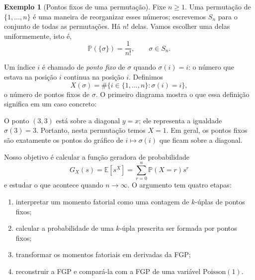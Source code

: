 \documentclass[12pt,portuguese]{article}
\theoremstyle{definition}
\newtheorem{example}[example]{Exemplo}
\theoremstyle{plainexercise}
\theoremstyle{starredexercise}
\theoremstyle{definition}
\begin{document}
\begin{example}[Pontos fixos de uma permutação]\label{ex:pontos-fixos-permutacao}
Fixe $n\geqslant1$. Uma permutação de
$\{1,\ldots,n\}$ é uma maneira de reorganizar esses números; escrevemos
$S_n$ para o conjunto de todas as permutações. Há $n!$ delas. Vamos escolher
uma delas uniformemente, isto é,
\[
\mathbb{P}(\{\sigma\})=\frac{1}{n!},
\qquad \sigma\in S_n.
\]

Um índice $i$ é chamado de \emph{ponto fixo} de $\sigma$ quando
$\sigma(i)=i$: o número que estava na posição $i$ continua na posição $i$.
Definimos
\[
X(\sigma)=\#\{i\in\{1,\ldots,n\}:\sigma(i)=i\},
\]
o número de pontos fixos de $\sigma$. O primeiro diagrama mostra o que essa
definição significa em um caso concreto:
\begin{center}
\end{center}
\noindent
O ponto $(3,3)$ está sobre a diagonal $y=x$; ele representa a igualdade
$\sigma(3)=3$. Portanto, nesta permutação temos $X=1$. Em geral, os pontos
fixos são exatamente os pontos do gráfico de $i\mapsto\sigma(i)$ que ficam
sobre a diagonal.

Nosso objetivo é calcular a função geradora de probabilidade
\[
G_X(s)=\mathbb{E}[s^X]
      =\sum_{r=0}^{n}\mathbb{P}(X=r)s^r
\]
e estudar o que acontece quando $n\to\infty$. O argumento tem quatro etapas:
\begin{enumerate}[label=\arabic*., itemsep=0pt, topsep=0pt,
parsep=0pt]
\item interpretar um momento fatorial como uma contagem de $k$-úplas de
pontos fixos;
\item calcular a probabilidade de uma $k$-úpla prescrita ser formada por
pontos fixos;
\item transformar os momentos fatoriais em derivadas da FGP;
\item reconstruir a FGP e compará-la com a FGP de uma variável
$\mathrm{Poisson}(1)$.
\end{enumerate}


\end{example}
\end{document}
